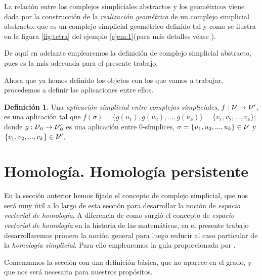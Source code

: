 \documentclass[12pt, a4paper, twoside]{book}
\numberwithin{equation}{section}
\theoremstyle{definition}
\newtheorem{defi}{Definición}
\theoremstyle{remark}
\theoremstyle{plain}
\begin{document}
	La relación entre los complejos simpliciales abstractos y los 
	geométricos viene dada por la construcción de la \emph{realización
	geométrica} de un complejo simplicial abstracto, que es un complejo 
	simplicial geométrico definido tal y como se ilustra en la figura 
	\ref{fig:tetra} del ejemplo \ref{ejem:1}(para más detalles véase 
	\cite{TopoAlg-Edelsbrunner}).

	De aquí en adelante emplearemos la definición de complejo simplicial 
	abstracto, pues es la más adecuada para el presente trabajo.

	Ahora que ya hemos definido los objetos con los que vamos a trabajar, 
	procedemos a definir las aplicaciones entre ellos.
	\begin{defi}
		Una \textit{aplicación simplicial entre complejos 
		simpliciales}, $f:\text{{\Large $\nu$}} \rightarrow 
		\text{{\Large $\nu$}$^{\prime}$}$, es una aplicación 
		tal que $f(\sigma)=\{g(u_{1}),g(u_{2}),...,g(u_{k})\}=
		\{v_{1},v_{2},...,v_{k}\}$; donde
		$g:\text{{\Large $\nu$}$_{0}$} \rightarrow \text{{\Large 
		$\nu$}$_{0}^{\prime}$}$ es una aplicación entre $0$-símplices,
		$\sigma=\{u_{1},u_{2},...,u_{k}\} \in \text{{\Large $\nu$}}$
		y $\{v_{1},v_{2},...,v_{k}\} \in \text{{\Large $\nu$}$^{
		\prime}$}$.	
	\end{defi}
	
	\section{Homología. Homología persistente}
	
	En la sección anterior hemos fijado el concepto de complejo 
	simplicial, que nos será muy útil a lo largo de esta sección para 
	desarrollar la noción de \emph{espacio vectorial de homología}. A 
	diferencia de como surgió el concepto de \emph{espacio vectorial de
	homología} en la historia de las matemáticas, en el presente trabajo 
	desarrollaremos primero la noción general para luego reducir al caso 
	particular de la \emph{homología simplicial}. Para ello emplearemos la 
	guía proporcionada por \cite{TopoAlg-Edelsbrunner,Homologia-Macho,
	Algebra-Elduque}.

	Comenzamos la sección con una definición básica, que no aparece en el 
	grado, y que nos será necesaria para nuestros propósitos.
\end{document}
